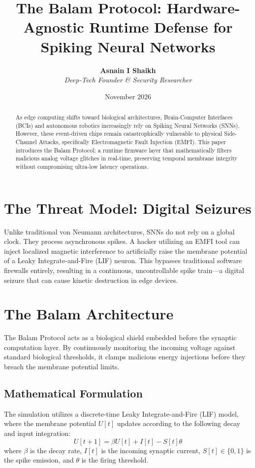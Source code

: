 \documentclass[12pt, a4paper]{article}
\title{\textbf{The Balam Protocol: Hardware-Agnostic Runtime Defense for Spiking Neural Networks}}
\author{\textbf{Asnain I Shaikh} \\ \textit{Deep-Tech Founder \& Security Researcher}}
\date{November 2026}
\begin{document}
\maketitle

\begin{abstract}
As edge computing shifts toward biological architectures, Brain-Computer Interfaces (BCIs) and autonomous robotics increasingly rely on Spiking Neural Networks (SNNs). However, these event-driven chips remain catastrophically vulnerable to physical Side-Channel Attacks, specifically Electromagnetic Fault Injection (EMFI). This paper introduces the Balam Protocol: a runtime firmware layer that mathematically filters malicious analog voltage glitches in real-time, preserving temporal membrane integrity without compromising ultra-low latency operations.
\end{abstract}

\section{The Threat Model: Digital Seizures}
Unlike traditional von Neumann architectures, SNNs do not rely on a global clock. They process asynchronous spikes. A hacker utilizing an EMFI tool can inject localized magnetic interference to artificially raise the membrane potential of a Leaky Integrate-and-Fire (LIF) neuron. This bypasses traditional software firewalls entirely, resulting in a continuous, uncontrollable spike train—a digital seizure that can cause kinetic destruction in edge devices.

\section{The Balam Architecture}
The Balam Protocol acts as a biological shield embedded before the synaptic computation layer. By continuously monitoring the incoming voltage against standard biological thresholds, it clamps malicious energy injections before they breach the membrane potential limits.

\subsection*{Mathematical Formulation}
The simulation utilizes a discrete-time Leaky Integrate-and-Fire (LIF) model, where the membrane potential $U[t]$ updates according to the following decay and input integration:
\begin{equation}
    U[t+1] = \beta U[t] + I[t] - S[t]\theta
\end{equation}
where $\beta$ is the decay rate, $I[t]$ is the incoming synaptic current, $S[t] \in \{0,1\}$ is the spike emission, and $\theta$ is the firing threshold.
\end{document}
